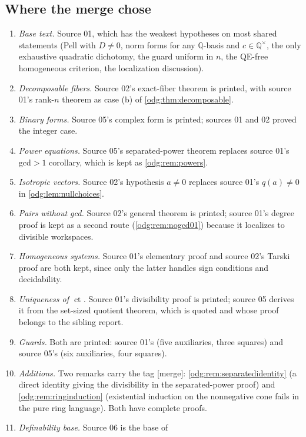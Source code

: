 \documentclass[11pt,oneside]{article}
\numberwithin{equation}{section}
\theoremstyle{definition}
\theoremstyle{remark}
\newcommand{\Q}{\mathbb Q}
\newcommand{\ct}{\operatorname{ct}}
\newcommand{\mergetag}{\textup{\textsf{\small[merge]}}}
\begin{document}
\subsection{Where the merge chose}

\begin{enumerate}[leftmargin=*]
\item \emph{Base text.} Source 01, which has the weakest hypotheses on most
shared statements (Pell with $D\ne0$, norm forms for any $\Q$-basis and
$c\in\Q^\times$, the only exhaustive quadratic dichotomy, the guard uniform in
$n$, the QE-free homogeneous criterion, the localization discussion).
\item \emph{Decomposable fibers.} Source 02's exact-fiber theorem is printed,
with source 01's rank-$n$ theorem as case (b) of
\cref{odg:thm:decomposable}.
\item \emph{Binary forms.} Source 05's complex form is printed; sources 01 and
02 proved the integer case.
\item \emph{Power equations.} Source 05's separated-power theorem replaces
source 01's gcd$>1$ corollary, which is kept as \cref{odg:rem:powers}.
\item \emph{Isotropic vectors.} Source 02's hypothesis $a\ne0$ replaces
source 01's $q(a)\ne0$ in \cref{odg:lem:nullchoices}.
\item \emph{Pairs without gcd.} Source 02's general theorem is printed; source
01's degree proof is kept as a second route (\cref{odg:rem:nogcd01}) because
it localizes to divisible workspaces.
\item \emph{Homogeneous systems.} Source 01's elementary proof and source 02's
Tarski proof are both kept, since only the latter handles sign conditions
and decidability.
\item \emph{Uniqueness of $\ct$.} Source 01's divisibility proof is printed;
source 05 derives it from the set-sized quotient theorem, which is quoted
and whose proof belongs to the sibling report.
\item \emph{Guards.} Both are printed: source 01's (five auxiliaries, three
squares) and source 05's (six auxiliaries, four squares).
\item \emph{Additions.} Two remarks carry the tag \mergetag:
\cref{odg:rem:separatedidentity} (a direct identity giving the divisibility in
the separated-power proof) and \cref{odg:rem:ringinduction} (existential
induction on the nonnegative cone fails in the pure ring language). Both have
complete proofs.
\item \emph{Definability base.} Source 06 is the base of

\end{enumerate}
\end{document}
